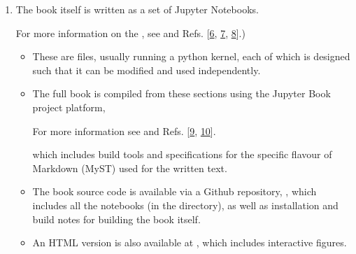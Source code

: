 \documentclass[letterpaper,table,10pt,english]{jupyterBook}
\begin{document}
\begin{enumerate}
%
\item {} 
\sphinxAtStartPar
The book itself is written as a set of Jupyter Notebooks.%
\begin{footnote}[1]\sphinxAtStartFootnote
For more information on the , see  and Refs. {[}\hyperlink{cite.backmatter/bibliography:id743}{6}, \hyperlink{cite.backmatter/bibliography:id656}{7}, \hyperlink{cite.backmatter/bibliography:id573}{8}{]}.)
%
\end{footnote}
\begin{itemize}
\item {} 
\sphinxAtStartPar
These are  files, usually running a python kernel, each of which is designed such that it can be modified and used independently.

\item {} 
\sphinxAtStartPar
The full book is compiled from these sections using the Jupyter Book project platform,%
\begin{footnote}[2]\sphinxAtStartFootnote
For more information see  and Refs. {[}\hyperlink{cite.backmatter/bibliography:id643}{9}, \hyperlink{cite.backmatter/bibliography:id507}{10}{]}.
%
\end{footnote} which includes build tools and specifications for the specific flavour of Markdown (MyST) used for the written text.

\item {} 
\sphinxAtStartPar
The book source code is available via a Github repository, , which includes all the notebooks (in the  directory), as well as installation and build notes for building the book itself.

\item {} 
\sphinxAtStartPar
An HTML version is also available at , which includes interactive figures.

\end{itemize}


\end{enumerate}
\end{document}
